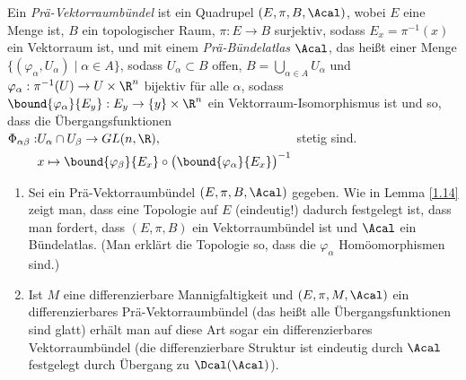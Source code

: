 \begin{defn}  
	Ein \emph{Prä-Vektorraumbündel} ist ein Quadrupel $ (E,\pi,B,\Acal) $, wobei $E$ eine Menge ist, $B$ ein topologischer Raum, $\pi: E \to B$ surjektiv, sodass $E_x = \pi^{-1}(x)$ ein Vektorraum ist, und mit einem \emph{Prä-Bündelatlas} $\Acal$, das heißt einer Menge $ \{(\varphi_\alpha,U_\alpha) \mid \alpha \in A\} $, sodass $U_\alpha \subset B$ offen, $ B = \bigcup_{\alpha \in A} U_\alpha $ und $ \varphi_\alpha: \pi^{-1}(U) \to U \times \R^n $ bijektiv für alle $\alpha$, sodass $ \bound{\varphi_\alpha}{E_y}: E_y \to \{y\} \times \R^n $ ein Vektorraum-Isomorphismus ist und so, dass die Übergangsfunktionen 
	$ \begin{aligned}[t]
		\Phi_{\alpha \beta}: &U_\alpha \cap U_\beta \to GL(n,\R),\\
		 &x \mapsto \bound{\varphi_\beta}{E_x} \circ \big( \bound{\varphi_\alpha}{E_x} \big)^{-1}
	\end{aligned} $ stetig sind.
\end{defn}

\begin{rem}
	\begin{enumerate}[label= {\roman*})]
		\item Sei ein Prä-Vektorraumbündel $ (E,\pi,B,\Acal) $ gegeben. Wie in Lemma \ref{1.14} zeigt man, dass eine Topologie auf $E$ (eindeutig!) dadurch festgelegt ist, dass man fordert, dass $(E,\pi,B)$ ein Vektorraumbündel ist und $\Acal$ ein Bündelatlas. (Man erklärt die Topologie so, dass die $\varphi_\alpha$ Homöomorphismen sind.)
		\item Ist $M$ eine differenzierbare Mannigfaltigkeit und $ (E,\pi,M,\Acal) $ ein differenzierbares Prä-Vektorraumbündel (das heißt alle Übergangsfunktionen sind glatt) erhält man auf diese Art sogar ein differenzierbares Vektorraumbündel (die differenzierbare Struktur ist eindeutig durch $\Acal$ festgelegt durch Übergang zu $\Dcal(\Acal)$).
	\end{enumerate}
\end{rem}

